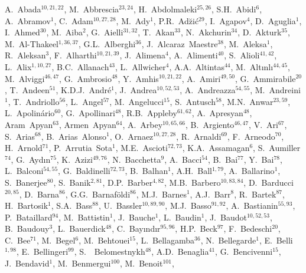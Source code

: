 A.~Abada$^{{10, 21, 22}}$,
M.~Abbrescia$^{{23, 24}}$,
H.~Abdolmaleki$^{{25, 26}}$,
S.H.~Abidi$^{{6}}$,
A.~Abramov$^{{1}}$,
C.~Adam$^{{10, 27, 28}}$,
M.~Ady$^{{1}}$,
P.R.~Ad{\u z}i{\'c}$^{{29}}$,
I.~Agapov$^{{4}}$,
D.~Aguglia$^{{1}}$,
I.~Ahmed$^{{30}}$,
M.~Aiba$^{{2}}$,
G.~Aielli$^{{31, 32}}$,
T.~Akan$^{{33}}$,
N.~Akchurin$^{{34}}$,
D.~Akturk$^{{35}}$,
M.~Al-Thakeel$^{{1, 36, 37}}$,
G.L.~Alberghi$^{{36}}$,
J.~Alcaraz~Maestre$^{{38}}$,
M.~Aleksa$^{{1}}$,
R.~Aleksan$^{{3}}$,
F.~Alharthi$^{{10, 21, 39}}$,
J.~Alimena$^{{4}}$,
A.~Alimenti$^{{40}}$,
S.~Alioli$^{{41, 42}}$,
L.~Alix$^{{1, 10, 27}}$,
B.C.~Allanach$^{{43}}$,
L.~Allwicher$^{{4}}$,
A.A.~Altintas$^{{44}}$,
M.~Alt{\i}nl{\i}$^{{44, 45}}$,
M.~Alviggi$^{{46, 47}}$,
G.~Ambrosio$^{{48}}$,
Y.~Amhis$^{{10, 21, 22}}$,
A.~Amiri$^{{49, 50}}$,
G.~Ammirabile$^{{20}}$,
T.~Andeen$^{{51}}$,
K.D.J.~Andr{\'e}$^{{1}}$,
J.~Andrea$^{{10, 52, 53}}$,
A.~Andreazza$^{{54, 55}}$,
M.~Andreini$^{{1}}$,
T.~Andriollo$^{{56}}$,
L.~Angel$^{{57}}$,
M.~Angelucci$^{{15}}$,
S.~Antusch$^{{58}}$,
M.N.~Anwar$^{{23, 59}}$,
L.~Apolin{\'a}rio$^{{60}}$,
G.~Apollinari$^{{48}}$,
R.B.~Appleby$^{{61, 62}}$,
A.~Apresyan$^{{48}}$,
Aram~Apyan$^{{63}}$,
Armen~Apyan$^{{64}}$,
A.~Arbey$^{{10, 65, 66}}$,
B.~Argiento$^{{46, 47}}$,
V.~Ari$^{{67}}$,
S.~Arias$^{{68}}$,
B.~Arias~Alonso$^{{1}}$,
O.~Arnaez$^{{10, 27, 28}}$,
R.~Arnaldi$^{{69}}$,
F.~Arneodo$^{{70}}$,
H.~Arnold$^{{71}}$,
P.~Arrutia~Sota$^{{1}}$,
M.E.~Ascioti$^{{72, 73}}$,
K.A.~Assamagan$^{{6}}$,
S.~Aumiller$^{{74}}$,
G.~Ayd{\i}n$^{{75}}$,
K.~Azizi$^{{49, 76}}$,
N.~Bacchetta$^{{9}}$,
A.~Bacci$^{{54}}$,
B.~Bai$^{{77}}$,
Y.~Bai$^{{78}}$,
L.~Balconi$^{{54, 55}}$,
G.~Baldinelli$^{{72, 73}}$,
B.~Balhan$^{{1}}$,
A.H.~Ball$^{{1, 79}}$,
A.~Ballarino$^{{1}}$,
S.~Banerjee$^{{80}}$,
S.~Banik$^{{2, 81}}$,
D.P.~Barber$^{{4, 82}}$,
M.B.~Barbero$^{{10, 83, 84}}$,
D.~Barducci$^{{20, 85}}$,
D.~Barna$^{{86}}$,
G.G.~Barnaf{\"o}ldi$^{{86}}$,
M.J.~Barnes$^{{1}}$,
A.J.~Barr$^{{8}}$,
R.~Bartek$^{{87}}$,
H.~Bartosik$^{{1}}$,
S.A.~Bass$^{{88}}$,
U.~Bassler$^{{10, 89, 90}}$,
M.J.~Basso$^{{91, 92}}$,
A.~Bastianin$^{{55, 93}}$,
P.~Bataillard$^{{94}}$,
M.~Battistin$^{{1}}$,
J.~Bauche$^{{1}}$,
L.~Baudin$^{{1}}$,
J.~Baudot$^{{10, 52, 53}}$,
B.~Baudouy$^{{3}}$,
L.~Bauerdick$^{{48}}$,
C.~Bay{\i}nd{\i}r$^{{95, 96}}$,
H.P.~Beck$^{{97}}$,
F.~Bedeschi$^{{20}}$,
C.~Bee$^{{71}}$,
M.~Begel$^{{6}}$,
M.~Behtouei$^{{15}}$,
L.~Bellagamba$^{{36}}$,
N.~Bellegarde$^{{1}}$,
E.~Belli$^{{1, 98}}$,
E.~Bellingeri$^{{99}}$,
S.~~Belomestnykh$^{{48}}$,
A.D.~Benaglia$^{{41}}$,
G.~Bencivenni$^{{15}}$,
J.~Bendavid$^{{1}}$,
M.~Benmergui$^{{100}}$,
M.~Benoit$^{{101}}$,
